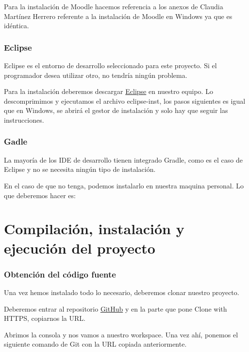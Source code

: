 Para la instalación de Moodle hacemos referencia a los anexos de Claudia Martínez Herrero \cite{claudia:anexo} referente a la instalación de Moodle en Windows ya que es idéntica.

\subsubsection{Eclipse}\label{eclipse}

Eclipse es el entorno de desarrollo seleccionado para este proyecto. Si el programador desea utilizar otro, no tendría ningún problema.

Para la instalación deberemos descargar \href{http://www.eclipse.org/downloads/}{Eclipse} en nuestro equipo. Lo descomprimimos y ejecutamos el archivo eclipse-inst, los pasos siguientes es igual que en Windows, se abrirá el gestor de instalación y solo hay que seguir las instrucciones.

\subsubsection{Gadle}\label{git}

La mayoría de los IDE de desarrollo tienen integrado Gradle, como es el caso de Eclipse y no se necesita ningún tipo de instalación.

En el caso de que no tenga, podemos instalarlo en nuestra maquina personal. Lo que deberemos hacer es:


\section{Compilación, instalación y ejecución del proyecto}

\subsubsection{Obtención del código fuente}\label{obtención-del-código-fuente}

Una vez hemos instalado todo lo necesario, deberemos clonar nuestro proyecto.

Deberemos entrar al repositorio \href{https://github.com/trona85/GII-17.1B-UBULog-1.0}{GitHub} y en la parte que pone Clone with HTTPS, copiarnos la URL.


Abrimos la consola y nos vamos a nuestro workspace. Una vez ahí, ponemos el siguiente comando de Git con la URL copiada anteriormente.

